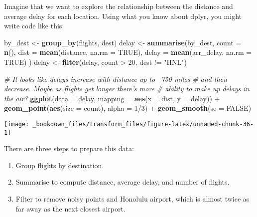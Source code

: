 \documentclass[]{book}
\newenvironment{Shaded}{\begin{snugshade}}{\end{snugshade}}
\newcommand{\KeywordTok}[1]{\textcolor[rgb]{0.13,0.29,0.53}{\textbf{{#1}}}}
\newcommand{\DataTypeTok}[1]{\textcolor[rgb]{0.13,0.29,0.53}{{#1}}}
\newcommand{\DecValTok}[1]{\textcolor[rgb]{0.00,0.00,0.81}{{#1}}}
\newcommand{\StringTok}[1]{\textcolor[rgb]{0.31,0.60,0.02}{{#1}}}
\newcommand{\CommentTok}[1]{\textcolor[rgb]{0.56,0.35,0.01}{\textit{{#1}}}}
\newcommand{\OtherTok}[1]{\textcolor[rgb]{0.56,0.35,0.01}{{#1}}}
\newcommand{\NormalTok}[1]{{#1}}
\begin{document}
Imagine that we want to explore the relationship between the distance
and average delay for each location. Using what you know about dplyr,
you might write code like this:

\begin{Shaded}
\begin{Highlighting}[]
\NormalTok{by_dest <-}\StringTok{ }\KeywordTok{group_by}\NormalTok{(flights, dest)}
\NormalTok{delay <-}\StringTok{ }\KeywordTok{summarise}\NormalTok{(by_dest,}
  \DataTypeTok{count =} \KeywordTok{n}\NormalTok{(),}
  \DataTypeTok{dist =} \KeywordTok{mean}\NormalTok{(distance, }\DataTypeTok{na.rm =} \OtherTok{TRUE}\NormalTok{),}
  \DataTypeTok{delay =} \KeywordTok{mean}\NormalTok{(arr_delay, }\DataTypeTok{na.rm =} \OtherTok{TRUE}\NormalTok{)}
\NormalTok{)}
\NormalTok{delay <-}\StringTok{ }\KeywordTok{filter}\NormalTok{(delay, count >}\StringTok{ }\DecValTok{20}\NormalTok{, dest !=}\StringTok{ "HNL"}\NormalTok{)}

\CommentTok{# It looks like delays increase with distance up to ~750 miles }
\CommentTok{# and then decrease. Maybe as flights get longer there's more }
\CommentTok{# ability to make up delays in the air?}
\KeywordTok{ggplot}\NormalTok{(}\DataTypeTok{data =} \NormalTok{delay, }\DataTypeTok{mapping =} \KeywordTok{aes}\NormalTok{(}\DataTypeTok{x =} \NormalTok{dist, }\DataTypeTok{y =} \NormalTok{delay)) +}
\StringTok{  }\KeywordTok{geom_point}\NormalTok{(}\KeywordTok{aes}\NormalTok{(}\DataTypeTok{size =} \NormalTok{count), }\DataTypeTok{alpha =} \DecValTok{1}\NormalTok{/}\DecValTok{3}\NormalTok{) +}
\StringTok{  }\KeywordTok{geom_smooth}\NormalTok{(}\DataTypeTok{se =} \OtherTok{FALSE}\NormalTok{)}
\end{Highlighting}
\end{Shaded}

\begin{center}\texttt{[image: \_bookdown\_files/transform\_files/figure-latex/unnamed-chunk-36-1]} \end{center}

There are three steps to prepare this data:

\begin{enumerate}
\def\labelenumi{\arabic{enumi}.}
\item
  Group flights by destination.
\item
  Summarise to compute distance, average delay, and number of flights.
\item
  Filter to remove noisy points and Honolulu airport, which is almost
  twice as far away as the next closest airport.
\end{enumerate}
\end{document}
